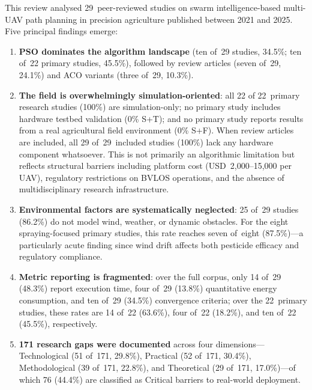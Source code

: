 \documentclass[review,3p]{elsarticle}
\begin{document}
This review analysed 29~peer-reviewed studies on swarm intelligence-based
multi-UAV path planning in precision agriculture published between 2021 and
2025. Five principal findings emerge:

\begin{enumerate}
  \item \textbf{PSO dominates the algorithm landscape} (ten of~29 studies,
  34.5\%; ten of~22 primary studies, 45.5\%), followed by review articles
  (seven of~29, 24.1\%) and ACO variants (three of~29, 10.3\%).

  \item \textbf{The field is overwhelmingly simulation-oriented}: all 22 of
  22~primary research studies (100\%) are simulation-only; no primary study
  includes hardware testbed validation (0\% S+T); and no primary study reports
  results from a real agricultural field environment (0\% S+F). When review
  articles are included, all 29 of~29~included studies (100\%) lack any hardware
  component whatsoever. This is not primarily an algorithmic limitation but
  reflects structural barriers including platform cost (USD~2,000--15,000 per
  UAV), regulatory restrictions on BVLOS operations, and the absence of
  multidisciplinary research infrastructure.

  \item \textbf{Environmental factors are systematically neglected}: 25 of~29
  studies (86.2\%) do not model wind, weather, or dynamic obstacles. For the
  eight spraying-focused primary studies, this rate reaches seven of~eight
  (87.5\%)---a particularly acute finding since wind drift affects both
  pesticide efficacy and regulatory compliance.

  \item \textbf{Metric reporting is fragmented}: over the full corpus,
  only 14 of~29 (48.3\%) report execution time, four of~29 (13.8\%) quantitative
  energy consumption, and ten of~29 (34.5\%) convergence criteria; over the
  22~primary studies, these rates are 14 of~22 (63.6\%), four of~22 (18.2\%),
  and ten of~22 (45.5\%), respectively.

  \item \textbf{171 research gaps were documented} across four dimensions---Technological
  (51 of~171, 29.8\%), Practical (52 of~171, 30.4\%), Methodological (39 of~171,
  22.8\%), and Theoretical (29 of~171, 17.0\%)---of which 76 (44.4\%) are
  classified as Critical barriers to real-world deployment.
\end{enumerate}
\end{document}
